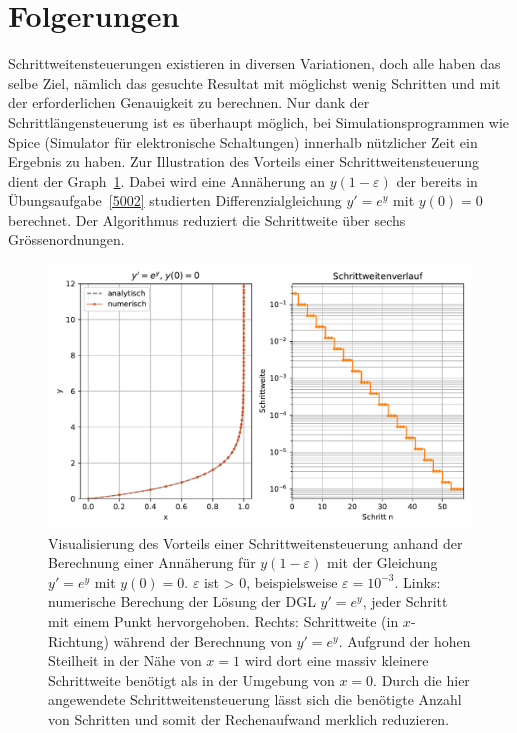 %
%
%
\section{Folgerungen
\label{steps:section:folgerungen}}
Schrittweitensteuerungen existieren in diversen Variationen, doch alle haben das selbe Ziel, nämlich
das gesuchte Resultat mit möglichst wenig Schritten und mit der erforderlichen Genauigkeit zu berechnen.
Nur dank der Schrittlängensteuerung ist es überhaupt möglich, bei Simulationsprogrammen wie Spice (Simulator für elektronische Schaltungen)
%
%
%
%
innerhalb nützlicher Zeit ein Ergebnis zu haben. Zur Illustration des Vorteils einer Schrittweitensteuerung dient der Graph~\ref{buch:steps:beispielfuerssc}.
Dabei wird eine Annäherung an $y(1-\varepsilon)$ der bereits
in Übungsaufgabe~\ref{5002} studierten Differenzialgleichung
$y'=e^y$ mit $y(0)=0$ berechnet.
Der Algorithmus reduziert die Schrittweite über sechs Grössenordnungen.

\begin{figure}
    \centering
    \includegraphics[width=\textwidth]{papers/steps/img/example_for_ssc.pdf}
    \caption{Visualisierung des Vorteils einer Schrittweitensteuerung anhand der Berechnung einer Annäherung für
    $y(1-\varepsilon)$ mit der Gleichung $y'=e^y$ mit $y(0)=0$.
    $\varepsilon$ ist > $0$, beispielsweise $\varepsilon = 10^{-3}$.
    Links: numerische Berechung der Lösung der DGL $y'=e^y$, jeder Schritt mit einem Punkt hervorgehoben.
    Rechts: Schrittweite (in $x$-Richtung) während der Berechnung von $y'=e^y$.
    Aufgrund der hohen Steilheit in der Nähe von $x=1$ wird dort eine massiv kleinere Schrittweite benötigt
    als in der Umgebung von $x=0$. Durch die hier angewendete Schrittweitensteuerung lässt sich die benötigte
    Anzahl von Schritten und somit der Rechenaufwand merklich reduzieren.
    \label{buch:steps:beispielfuerssc}}
\end{figure}

